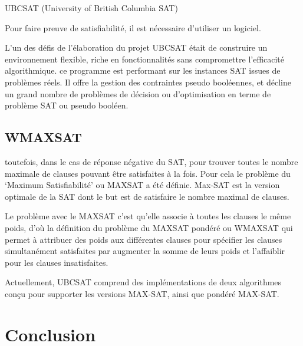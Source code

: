 UBCSAT (University of British Columbia SAT)

Pour faire preuve de satisfiabilité, il est nécessaire d’utiliser un logiciel.

L'un des défis de l'élaboration du projet UBCSAT était de construire un environnement flexible, riche en fonctionnalités sans compromettre l'efficacité algorithmique. ce programme est performant sur les instances SAT issues de problèmes réels. Il offre la gestion des contraintes pseudo booléennes, et décline un grand nombre de problèmes de décision ou d’optimisation en terme de problème SAT ou pseudo booléen.    
\subsection{WMAXSAT}

toutefois, dans le cas de réponse négative du SAT, pour trouver toutes le nombre maximale de clauses pouvant être satisfaites à la fois. Pour cela le problème du ‘Maximum Satisfiabilité’ ou MAXSAT a été définie. Max-SAT est la version optimale de la SAT dont le but est de satisfaire le nombre maximal de clauses.

Le problème avec le MAXSAT c’est qu’elle associe à toutes les clauses le même poids, d’où la définition du problème du MAXSAT pondéré ou WMAXSAT qui permet à attribuer des poids aux différentes clauses pour spécifier les clauses simultanément satisfaites par augmenter la somme de leurs poids et l’affaiblir pour les clauses insatisfaites.

Actuellement, UBCSAT comprend des implémentations de deux algorithmes conçu pour supporter les versions MAX-SAT, ainsi que pondéré MAX-SAT.

\section*{Conclusion}
